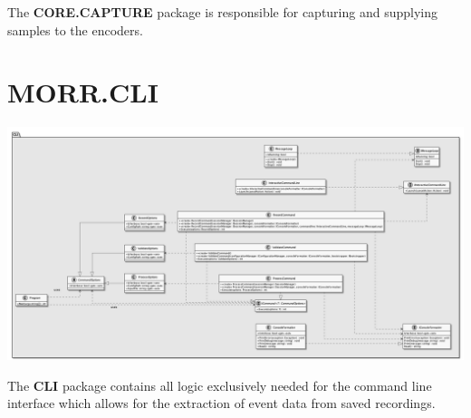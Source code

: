 The \textbf{CORE.CAPTURE} package is responsible for capturing and supplying samples to the encoders.

\begin{packif}
\end{packif}

\begin{packclass}
\end{packclass}

\newpage
\section{MORR.CLI}

\begin{center}
    \includegraphics[width=1.0\textwidth]{resources/Packages/CLI.png}
\end{center}

The \textbf{CLI} package contains all logic exclusively needed for the command line interface which allows for the extraction of event data from saved recordings.

\begin{packif}
\end{packif}

\begin{packclass}
\end{packclass}

